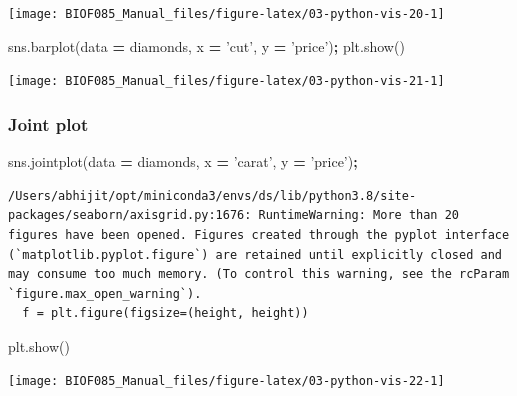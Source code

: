 \documentclass[
  letterpaper,
]{scrbook}
\newenvironment{Shaded}{\begin{snugshade}}{\end{snugshade}}
\newcommand{\NormalTok}[1]{#1}
\newcommand{\OperatorTok}[1]{\textcolor[rgb]{0.81,0.36,0.00}{\textbf{#1}}}
\newcommand{\StringTok}[1]{\textcolor[rgb]{0.31,0.60,0.02}{#1}}
\begin{document}
\begin{center}\texttt{[image: BIOF085\_Manual\_files/figure-latex/03-python-vis-20-1]} \end{center}

\begin{Shaded}
\begin{Highlighting}[]
\NormalTok{sns.barplot(data }\OperatorTok{=}\NormalTok{ diamonds, x }\OperatorTok{=} \StringTok{'cut'}\NormalTok{, y }\OperatorTok{=} \StringTok{'price'}\NormalTok{)}\OperatorTok{;}
\NormalTok{plt.show()}
\end{Highlighting}
\end{Shaded}

\begin{center}\texttt{[image: BIOF085\_Manual\_files/figure-latex/03-python-vis-21-1]} \end{center}

\hypertarget{joint-plot}{%
\subsubsection{Joint plot}\label{joint-plot}}

\begin{Shaded}
\begin{Highlighting}[]
\NormalTok{sns.jointplot(data }\OperatorTok{=}\NormalTok{ diamonds, x }\OperatorTok{=} \StringTok{'carat'}\NormalTok{, y }\OperatorTok{=} \StringTok{'price'}\NormalTok{)}\OperatorTok{;}
\end{Highlighting}
\end{Shaded}

\begin{verbatim}
/Users/abhijit/opt/miniconda3/envs/ds/lib/python3.8/site-packages/seaborn/axisgrid.py:1676: RuntimeWarning: More than 20 figures have been opened. Figures created through the pyplot interface (`matplotlib.pyplot.figure`) are retained until explicitly closed and may consume too much memory. (To control this warning, see the rcParam `figure.max_open_warning`).
  f = plt.figure(figsize=(height, height))
\end{verbatim}

\begin{Shaded}
\begin{Highlighting}[]
\NormalTok{plt.show()}
\end{Highlighting}
\end{Shaded}

\begin{center}\texttt{[image: BIOF085\_Manual\_files/figure-latex/03-python-vis-22-1]} \end{center}
\end{document}
